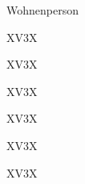 \begin{discourse}{Wohnen}{person}
\begin{tabularx}{\linewidth}{XV{3}X}
	 \\
	\bline
\end{tabularx}

\begin{tabularx}{\linewidth}{XV{3}X}
	 \\
	\bline
\end{tabularx}

\begin{tabularx}{\linewidth}{XV{3}X}
	 \\
	\bline
\end{tabularx}

\begin{tabularx}{\linewidth}{XV{3}X}
	 \\
	\bline
\end{tabularx}

\begin{tabularx}{\linewidth}{XV{3}X}
	 \\
	\bline
\end{tabularx}

\begin{tabularx}{\linewidth}{XV{3}X}
	 \\
	\bline
\end{tabularx}
\end{discourse}
